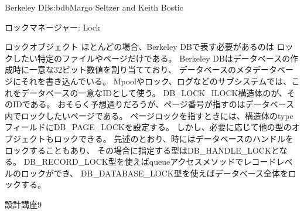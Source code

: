 \begin{aosachapter}{Berkeley DB}{s:bdb}{Margo Seltzer and Keith Bostic}
\begin{aosasect1}{ロックマネージャー: Lock}
\begin{aosasect2}{ロックオブジェクト}
ほとんどの場合、Berkeley DBで表す必要があるのは
ロックしたい特定のファイルやページだけである。
Berkeley DBはデータベースの作成時に一意な32ビット数値を割り当てており、
データベースのメタデータページにそれを書き込んでいる。
Mpoolやロック、ログなどのサブシステムでは、これをデータベースの一意なIDとして使う。
DB\_LOCK\_ILOCK構造体のが、そのIDである。
おそらく予想通りだろうが、ページ番号が指すのはデータベース内でロックしたいページである。
ページロックを指すときには、構造体のtypeフィールドにDB\_PAGE\_LOCKを設定する。
しかし、必要に応じて他の型のオブジェクトもロックできる。
先述のとおり、時にはデータベースのハンドルをロックすることもあり、
その場合に指定する型はDB\_HANDLE\_LOCKとなる。
DB\_RECORD\_LOCK型を使えばqueueアクセスメソッドでレコードレベルのロックができ、
DB\_DATABASE\_LOCK型を使えばデータベース全体をロックする。
\hspace{-.5cm}
\begin{aosabox}{設計講座9}


\end{aosabox}
\end{aosasect2}
\end{aosasect1}
\end{aosachapter}
